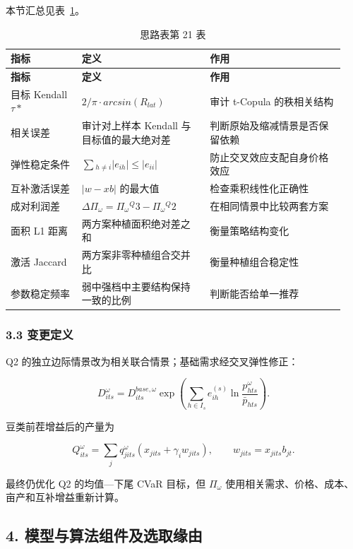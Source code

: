\documentclass[UTF8,11pt,a4paper]{ctexart}
\begin{document}
\noindent 本节汇总见表~\ref{tab:thought-21}。
\begin{longtable}{@{}>{\raggedright\arraybackslash}p{0.20\linewidth}>{\raggedright\arraybackslash}p{0.36\linewidth}>{\raggedright\arraybackslash}p{0.38\linewidth}@{}}
\caption{思路表第 21 表}\label{tab:thought-21}\\
\toprule
\textbf{指标} & \textbf{定义} & \textbf{作用} \\
\midrule
\endfirsthead
\toprule
\textbf{指标} & \textbf{定义} & \textbf{作用} \\
\midrule
\endhead
目标 Kendall \(\tau{}*\) & \(2/\pi{}·arcsin(R_{lat})\) & 审计 t-Copula 的秩相关结构 \\
相关误差 & 审计对上样本 Kendall 与目标值的最大绝对差 & 判断原始及缩减情景是否保留依赖 \\
弹性稳定条件 & \(\sum{}_{h\neq{}i}\lvert e_{ih}\rvert\leq{}\lvert e_{ii}\rvert\) & 防止交叉效应支配自身价格效应 \\
互补激活误差 & \(\lvert w-xb\rvert\) 的最大值 & 检查乘积线性化正确性 \\
成对利润差 & \(\Delta{}\Pi{}_\omega{}=\Pi{}_\omega{}^Q3-\Pi{}_\omega{}^Q2\) & 在相同情景中比较两套方案 \\
面积 L1 距离 & 两方案种植面积绝对差之和 & 衡量策略结构变化 \\
激活 Jaccard & 两方案非零种植组合交并比 & 衡量种植组合稳定性 \\
参数稳定频率 & 弱中强档中主要结构保持一致的比例 & 判断能否给单一推荐 \\
\bottomrule
\end{longtable}

\subsubsection{3.3 变更定义}

Q2 的独立边际情景改为相关联合情景；基础需求经交叉弹性修正：

\[
D_{its}^{\omega}=D_{its}^{base,\omega}
\exp\left(\sum_{h\in I_s}e_{ih}^{(s)}
\ln\frac{p_{hts}^{\omega}}{\bar p_{hts}}\right).
\]

豆类前茬增益后的产量为

\[
Q_{its}^{\omega}=\sum_jq_{jits}^{\omega}
\left(x_{jits}+\gamma_iw_{jits}\right),\qquad w_{jits}=x_{jits}b_{jt}.
\]

最终仍优化 Q2 的均值—下尾 CVaR 目标，但 \(\Pi{}_\omega{}\) 使用相关需求、价格、成本、亩产和互补增益重新计算。

\subsection{4. 模型与算法组件及选取缘由}
\end{document}
